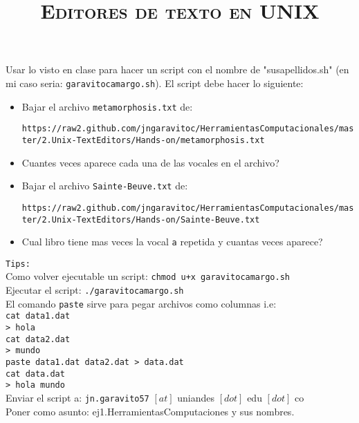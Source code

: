 \documentclass[12pt]{article}
\title{\textsc{Editores de texto en UNIX}}
\begin{document}
\date{}
\maketitle


Usar lo visto en clase para hacer un script con el nombre de "susapellidos.sh" (en mi caso seria: \texttt{garavitocamargo.sh}).
El script debe hacer lo siguiente:\\

\begin{itemize}

\item Bajar el archivo \texttt{metamorphosis.txt} de:\\
\begin{scriptsize}
\verb"https://raw2.github.com/jngaravitoc/HerramientasComputacionales/master/2.Unix-TextEditors/Hands-on/metamorphosis.txt"
\end{scriptsize}  

\item Cuantes veces aparece cada una de las vocales en el archivo?

\item Bajar el archivo \texttt{Sainte-Beuve.txt} de: 

\begin{scriptsize}
\verb"https://raw2.github.com/jngaravitoc/HerramientasComputacionales/master/2.Unix-TextEditors/Hands-on/Sainte-Beuve.txt"
\end{scriptsize} 

\item Cual libro tiene mas veces la vocal \texttt{a} repetida y cuantas veces aparece?


\end{itemize}

\texttt{Tips:}\\

Como volver ejecutable un script: \texttt{chmod u+x garavitocamargo.sh}\\

Ejecutar el script: \texttt{./garavitocamargo.sh}\\

El comando \texttt{paste} sirve para pegar archivos como columnas i.e:\\

\texttt{cat data1.dat}\\
\texttt{> hola}\\

\texttt{cat data2.dat} \\
\texttt{> mundo}\\

\texttt{paste data1.dat data2.dat >\ data.dat}\\
\texttt{cat data.dat}\\
\texttt{> hola mundo}\\




Enviar el script a: \texttt{jn.garavito57} $[at]$ uniandes $[dot]$ edu $[dot]$ co  \\

Poner como asunto: ej1.HerramientasComputaciones y sus nombres.
\end{document}
